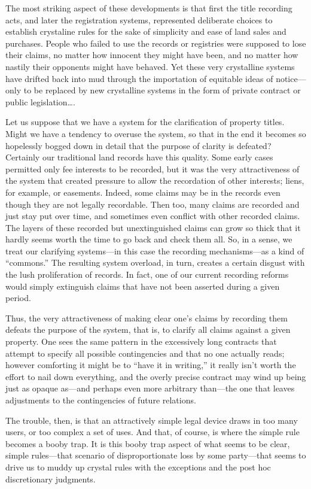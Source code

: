 The most striking aspect of these developments is that first the title recording
acts, and later the registration systems, represented deliberate choices to
establish crystaline rules for the sake of simplicity and ease of land sales
and purchases. People who failed to use the records or registries were supposed
to lose their claims, no matter how innocent they might have been, and no
matter how nastily their opponents might have behaved. Yet these very
crystalline systems have drifted back into mud through the importation of
equitable ideas of notice---only to be replaced by new crystalline systems in
the form of private contract or public legislation\ldots.

Let us suppose that we have a system for the clarification of property titles.
Might we have a tendency to overuse the system, so that in the end it becomes
so hopelessly bogged down in detail that the purpose of clarity is defeated?
Certainly our traditional land records have this quality. Some early cases
permitted only fee interests to be recorded, but it was the very attractiveness
of the system that created pressure to allow the recordation of other
interests; liens, for example, or easements. Indeed, some claims may be in the
records even though they are not legally recordable. Then too, many claims are
recorded and just stay put over time, and sometimes even conflict with other
recorded claims. The layers of these recorded but unextinguished claims can
grow so thick that it hardly seems worth the time to go back and check them
all. So, in a sense, we treat our clarifying systems---in this case the
recording mechanisms---as a kind of ``commons.'' The resulting system overload,
in turn, creates a certain disgust with the lush proliferation of records. In
fact, one of our current recording reforms would simply extinguish claims that
have not been asserted during a given period. 

Thus, the very attractiveness of making clear one's claims by recording them
defeats the purpose of the system, that is, to clarify all claims against a
given property. One sees the same pattern in the excessively long
contracts that attempt to specify all possible contingencies and that no one
actually reads; however comforting it might be to ``have it in writing,'' it
really isn't worth the effort to nail down everything, and the overly precise
contract may wind up being just as opaque as---and perhaps even more arbitrary
than---the one that leaves adjustments to the contingencies of future
relations. 

The trouble, then, is that an attractively simple legal device draws in too many
users, or too complex a set of uses. And that, of course, is where the simple
rule becomes a booby trap. It is this booby trap aspect of what seems to be
clear, simple rules---that scenario of disproportionate loss by some
party---that seems to drive us to muddy up crystal rules with the exceptions and
the post hoc discretionary judgments.

